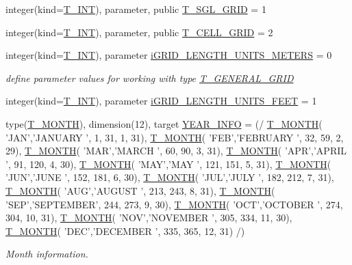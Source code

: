 \begin{DoxyCompactItemize}
\item 
integer(kind=\hyperlink{namespacetest_a6f91ebd89b58cfcc5da99faed9385c1e}{T\_\-INT}), parameter, public \hyperlink{namespacetest_a60ae6ddfc7d411862eddaea30f59049f}{T\_\-SGL\_\-GRID} = 1
\item 
integer(kind=\hyperlink{namespacetest_a6f91ebd89b58cfcc5da99faed9385c1e}{T\_\-INT}), parameter, public \hyperlink{namespacetest_afdd43703b42a2585fd3e53240e541b80}{T\_\-CELL\_\-GRID} = 2
\item 
integer(kind=\hyperlink{namespacetest_a6f91ebd89b58cfcc5da99faed9385c1e}{T\_\-INT}), parameter \hyperlink{namespacetest_a136c3b9231683ffea8eae2e7920d956d}{iGRID\_\-LENGTH\_\-UNITS\_\-METERS} = 0
\begin{DoxyCompactList}\small\item\em define parameter values for working with type \hyperlink{typetest_1_1_t___g_e_n_e_r_a_l___g_r_i_d}{T\_\-GENERAL\_\-GRID} \item\end{DoxyCompactList}\item 
integer(kind=\hyperlink{namespacetest_a6f91ebd89b58cfcc5da99faed9385c1e}{T\_\-INT}), parameter \hyperlink{namespacetest_ac5e6e1cd934b6a95f6d38d6a1e1f6bac}{iGRID\_\-LENGTH\_\-UNITS\_\-FEET} = 1
\item 
type(\hyperlink{typetest_1_1_t___m_o_n_t_h}{T\_\-MONTH}), dimension(12), target \hyperlink{namespacetest_a0cc123ab400cd2007652453350776116}{YEAR\_\-INFO} = (/ \hyperlink{typetest_1_1_t___m_o_n_t_h}{T\_\-MONTH}( 'JAN','JANUARY ', 1, 31, 1, 31), \hyperlink{typetest_1_1_t___m_o_n_t_h}{T\_\-MONTH}( 'FEB','FEBRUARY ', 32, 59, 2, 29), \hyperlink{typetest_1_1_t___m_o_n_t_h}{T\_\-MONTH}( 'MAR','MARCH ', 60, 90, 3, 31), \hyperlink{typetest_1_1_t___m_o_n_t_h}{T\_\-MONTH}( 'APR','APRIL ', 91, 120, 4, 30), \hyperlink{typetest_1_1_t___m_o_n_t_h}{T\_\-MONTH}( 'MAY','MAY ', 121, 151, 5, 31), \hyperlink{typetest_1_1_t___m_o_n_t_h}{T\_\-MONTH}( 'JUN','JUNE ', 152, 181, 6, 30), \hyperlink{typetest_1_1_t___m_o_n_t_h}{T\_\-MONTH}( 'JUL','JULY ', 182, 212, 7, 31), \hyperlink{typetest_1_1_t___m_o_n_t_h}{T\_\-MONTH}( 'AUG','AUGUST ', 213, 243, 8, 31), \hyperlink{typetest_1_1_t___m_o_n_t_h}{T\_\-MONTH}( 'SEP','SEPTEMBER', 244, 273, 9, 30), \hyperlink{typetest_1_1_t___m_o_n_t_h}{T\_\-MONTH}( 'OCT','OCTOBER ', 274, 304, 10, 31), \hyperlink{typetest_1_1_t___m_o_n_t_h}{T\_\-MONTH}( 'NOV','NOVEMBER ', 305, 334, 11, 30), \hyperlink{typetest_1_1_t___m_o_n_t_h}{T\_\-MONTH}( 'DEC','DECEMBER ', 335, 365, 12, 31) /)
\begin{DoxyCompactList}\small\item\em Month information. \item\end{DoxyCompactList}\item 

\end{DoxyCompactItemize}

